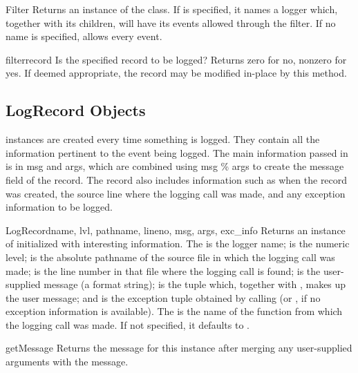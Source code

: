 \begin{classdesc}{Filter}{}
Returns an instance of the  class. If  is specified,
it names a logger which, together with its children, will have its events
allowed through the filter. If no name is specified, allows every event.
\end{classdesc}

\begin{methoddesc}{filter}{record}
Is the specified record to be logged? Returns zero for no, nonzero for
yes. If deemed appropriate, the record may be modified in-place by this
method.
\end{methoddesc}

\subsection{LogRecord Objects}

 instances are created every time something is logged. They
contain all the information pertinent to the event being logged. The
main information passed in is in msg and args, which are combined
using msg \% args to create the message field of the record. The record
also includes information such as when the record was created, the
source line where the logging call was made, and any exception
information to be logged.

\begin{classdesc}{LogRecord}{name, lvl, pathname, lineno, msg, args,
                             exc_info }
Returns an instance of  initialized with interesting
information. The  is the logger name;  is the
numeric level;  is the absolute pathname of the source
file in which the logging call was made;  is the line
number in that file where the logging call is found;  is the
user-supplied message (a format string);  is the tuple
which, together with , makes up the user message; and
 is the exception tuple obtained by calling
(or , if no exception information
is available). The  is the name of the function from which the
logging call was made. If not specified, it defaults to .
\end{classdesc}

\begin{methoddesc}{getMessage}{}
Returns the message for this  instance after merging any
user-supplied arguments with the message.
\end{methoddesc}

